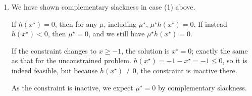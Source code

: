 \documentclass{article}[a4paper]
\begin{document}
\begin{enumerate}[label=(\alph*), ref=2.\alph*]
        The inequality $\mathcal{L}\left( \mu, x^\star \right) \leq \mathcal{L}\left( \mu^\star, x^\star \right)$ requires that $\mathcal{L}\left( \mu, x^\star \right)$ be less than or equal to a finite number as $\mu$ is varied over non-negative values.

        But $\mathcal{L}\left( \mu, x^\star \right) = f\left( x^\star \right) + \mu h\left( x^\star \right)$. If $h\left( x^\star \right) > 0$, then as $\mu \to \infty$, $\mathcal{L}\left( \mu, x^\star \right) \to \infty$ as well, contradicting the inequality. Hence, we must have $h\left( x^\star \right) \leq 0$.
        
        If $h\left( x^\star \right) < 0$, then as $\mu \to \infty$, $\mathcal{L}\left( \mu, x^\star \right) \to -\infty$. It will remain bounded above by a finite number, but by itself will decrease without bound.

        Hence, if we also require $\mathcal{L}\left( \mu, x^\star \right)$ to remain finite as $\mu \to \infty$, the only possibility is that $h\left( x^\star \right) = 0$.
        
        \item \label{q2c} We have shown complementary slackness in case (1) above.
        
        If $h\left( x^\star \right) = 0$, then for any $\mu$, including $\mu^\star$, $\mu^\star h\left( x^\star \right) = 0$. If instead $h\left( x^\star \right) < 0$, then $\mu^\star = 0$, and we still have $\mu^\star h\left( x^\star \right) = 0$.

        If the constraint changes to $x \geq -1$, the solution is $x^\star = 0$; exactly the same as that for the unconstrained problem. $h\left( x^\star \right) = -1 - x^\star = -1 \leq 0$, so it is indeed feasible, but because $h\left( x^\star \right) \ne 0$, the constraint is inactive there.

        As the constraint is inactive, we expect $\mu^\star = 0$ by complementary slackness.
    \end{enumerate}
\end{document}
